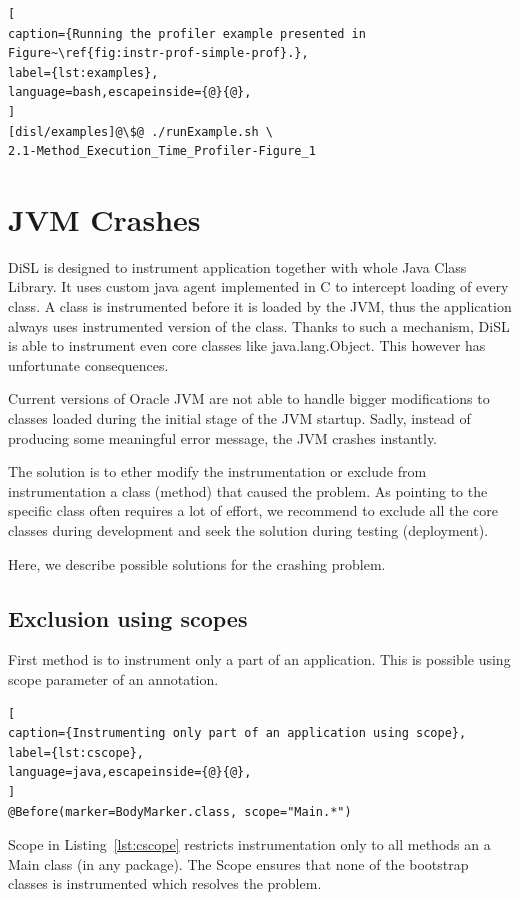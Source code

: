 \documentclass{article}
\begin{document}
\begin{lstlisting}[
caption={Running the profiler example presented in Figure~\ref{fig:instr-prof-simple-prof}.},
label={lst:examples},
language=bash,escapeinside={@}{@},
]
[disl/examples]@\$@ ./runExample.sh \
2.1-Method_Execution_Time_Profiler-Figure_1
\end{lstlisting}

\newpage

\section{JVM Crashes}\label{sec:Crashes}

DiSL is designed to instrument application together with whole Java Class Library.
It uses custom java agent implemented in C to intercept loading of every class.
A class is instrumented before it is loaded by the JVM, thus the application always uses instrumented version of the class.
Thanks to such a mechanism, DiSL is able to instrument even core classes like java.lang.Object.
This however has unfortunate consequences.

Current versions of Oracle JVM are not able to handle bigger modifications to classes loaded during the initial stage of the JVM startup.
Sadly, instead of producing some meaningful error message, the JVM crashes instantly.

The solution is to ether modify the instrumentation or exclude from instrumentation a class (method) that caused the problem.
As pointing to the specific class often requires a lot of effort, we recommend to exclude all the core classes during development and seek the solution during testing (deployment).

Here, we describe possible solutions for the crashing problem.

\subsection{Exclusion using scopes}

First method is to instrument only a part of an application.
This is possible using scope parameter of an annotation.

\begin{lstlisting}[
caption={Instrumenting only part of an application using scope},
label={lst:cscope},
language=java,escapeinside={@}{@},
]
@Before(marker=BodyMarker.class, scope="Main.*")
\end{lstlisting}

Scope in Listing~\ref{lst:cscope} restricts instrumentation only to all methods an a Main class (in any package).
The Scope ensures that none of the bootstrap classes is instrumented which resolves the problem.
\end{document}
